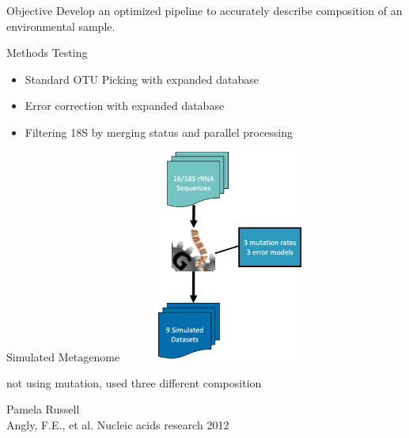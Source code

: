 \documentclass[11pt, xcolor=table]{beamer}
\begin{document}
	\begin{frame}{Objective}
	Develop an optimized pipeline to accurately describe composition of an environmental sample.
	\begin{block}{Methods Testing}
	\begin{itemize}
	\item Standard OTU Picking with expanded database
	\item Error correction with expanded database
	\item Filtering 18S by merging status and parallel processing
	\end{itemize}
	\end{block}
	\end{frame}
	\begin{frame}{Simulated Metagenome}
	\center
	\includegraphics[height=7cm, width=7cm]{CPBS_11_18/simulated.jpg}
	\begin{flushright}
	
	not using mutation, used three different composition
	
	
	\tiny{Pamela Russell \\ Angly, F.E., et al. Nucleic acids research 2012}
	\end{flushright}
	\end{frame}
\end{document}
